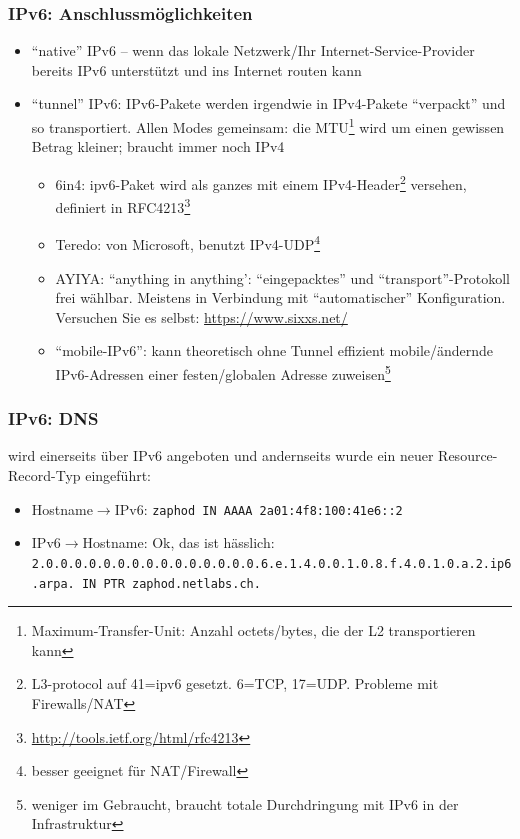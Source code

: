 \documentclass[ignorenonframetext]{beamer}
\begin{document}
\begin{frame}
\frametitle{IPv6: Anschlussm\"oglichkeiten}
\begin{itemize}
  \item ``native'' IPv6 -- wenn das lokale Netzwerk/Ihr Internet-Service-Provider bereits IPv6 unterst\"utzt und ins Internet routen kann
  \item ``tunnel'' IPv6: IPv6-Pakete werden irgendwie in IPv4-Pakete ``verpackt'' und so transportiert. Allen Modes gemeinsam: die MTU\footnote{Maximum-Transfer-Unit: Anzahl octets/bytes, die der L2 transportieren kann} wird um einen gewissen Betrag kleiner; braucht immer noch IPv4
     \begin{itemize}
        \item 6in4: ipv6-Paket wird als ganzes mit einem IPv4-Header\footnote{L3-protocol auf 41=ipv6 gesetzt. 6=TCP, 17=UDP. Probleme mit Firewalls/NAT} versehen, definiert in RFC4213\footnote{\url{http://tools.ietf.org/html/rfc4213}}
        \item Teredo: von Microsoft, benutzt IPv4-UDP\footnote{besser geeignet f\"ur NAT/Firewall}
        \item AYIYA: ``anything in anything': ``eingepacktes'' und ``transport''-Protokoll frei w\"ahlbar. Meistens in Verbindung mit ``automatischer'' Konfiguration. {\tiny Versuchen Sie es selbst: \url{https://www.sixxs.net/}}
	\item ``mobile-IPv6'': kann theoretisch ohne Tunnel effizient mobile/\"andernde IPv6-Adressen einer festen/globalen Adresse zuweisen\footnote{weniger im Gebraucht, braucht totale Durchdringung mit IPv6 in der Infrastruktur}
     \end{itemize}
\end{itemize}
\end{frame}

\begin{frame}
\frametitle{IPv6: DNS}
wird einerseits \"uber IPv6 angeboten und andernseits wurde ein neuer Resource-Record-Typ eingef\"uhrt:
\begin{itemize}
	\item Hostname$\rightarrow$IPv6: \texttt{zaphod		IN AAAA		2a01:4f8:100:41e6::2}
	\item IPv6$\rightarrow$Hostname: Ok, das ist h\"asslich:\\ {\tiny \texttt{2.0.0.0.0.0.0.0.0.0.0.0.0.0.0.0.6.e.1.4.0.0.1.0.8.f.4.0.1.0.a.2.ip6.arpa. IN PTR zaphod.netlabs.ch.}}
\end{itemize}
\end{frame}
\end{document}
